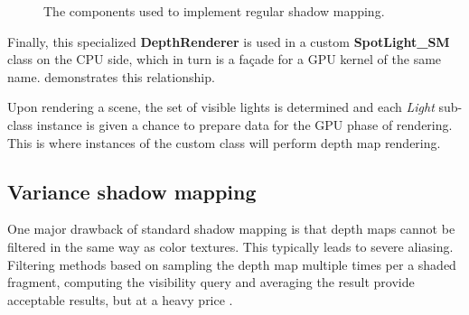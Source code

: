 \begin{figure}[ht!]
  \centering
    \caption[Shadow mapping components]{The components used to implement regular shadow mapping.}
  \label{fig:ShadowMappingUML}
\end{figure}

Finally, this specialized \textbf{DepthRenderer} is used in a custom \textbf{SpotLight\_SM} class on the CPU side, which in turn is a façade for a GPU kernel of the same name.  demonstrates this relationship.

Upon rendering a scene, the set of visible lights is determined and each \emph{Light} sub-class instance is given a chance to prepare data for the GPU phase of rendering. This is where instances of the custom class will perform depth map rendering.

\subsection{Variance shadow mapping}

One major drawback of standard shadow mapping is that depth maps cannot be filtered in the same way as color textures. This typically leads to severe aliasing. Filtering methods based on sampling the depth map multiple times per a shaded fragment, computing the visibility query and averaging the result provide acceptable results, but at a heavy price \cite{advancedSoftShadowMapping}.

